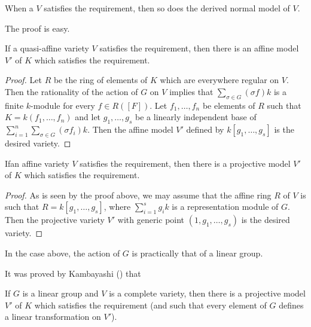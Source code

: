 \begin{proposition}\label{art16-prop1.1}
When a $V$ satisfies the requirement, then so does the derived normal model of $V$.
\end{proposition}

The proof is easy.

\begin{proposition}\label{art16-prop1.2}
If a quasi-affine variety $V$ satisfies the requirement, then there is an affine model $V'$ of $K$ which satisfies the requirement.
\end{proposition}

\begin{proof}
Let $R$ be the ring of elements of $K$ which are everywhere regular on $V$. Then the rationality of the action of $G$ on $V$ implies that $\sum\limits_{\sigma \in G}(\sigma f)k$ is a finite $k$-module for every $f\in R([F])$. Let $f_{1},\ldots,f_{n}$ be elements of $R$ such that $K=k(f_{1},\ldots,f_{n})$ and let $g_{1},\ldots,g_{s}$ be a linearly independent base of $\sum\limits^{n}_{i=1}\sum\limits_{\sigma \in G}(\sigma f_{i})k$. Then the affine model $V'$ defined by $k[g_{1},\ldots,g_{s}]$ is the desired variety.
\end{proof}

\begin{proposition}\label{art16-prop1.3}
If\pageoriginale an affine variety $V$ satisfies the requirement, then there is a projective model $V'$ of $K$ which satisfies the requirement.
\end{proposition}

\begin{proof}
As is seen by the proof above, we may assume that the affine ring $R$ of $V$ is such that $R=k[g_{1},\ldots,g_{s}]$, where $\sum\limits^{s}_{i=1}g_{i}k$ is a representation module of $G$. Then the projective variety $V'$ with generic point $(1,g_{1},\ldots,g_{s})$ is the desired variety.
\end{proof}

\begin{remark}\label{art16-rem1.4}
In the case above, the action of $G$ is practically that of a linear group.
\end{remark}

It was proved by Kambayashi (\cite{art16-key-K}) that

\begin{proposition}\label{art16-prop1.5}
If $G$ is a linear group and $V$ is a complete variety, then there is a projective model $V'$ of $K$ which satisfies the requirement (and such that every element of $G$ defines a linear transformation on $V'$).
\end{proposition}

